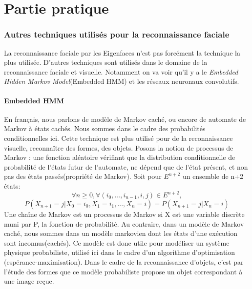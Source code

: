 \documentclass[12pt,french]{article}
\theoremstyle{plain}
\theoremstyle{definition}
\begin{document}
\newpage
\part{Partie pratique}
\section{Autres techniques utilisés pour la reconnaissance faciale}
La reconnaissance faciale par les Eigenfaces n'est pas forcément la technique la plus utilisée. D'autres techniques sont utilisés dans le domaine de la reconnaissance faciale et visuelle. Notamment on va voir qu'il y a le \textit{ Embedded Hidden Markov Model}(Embedded HMM) et les réseaux neuronaux convolutifs.
\subsection{Embedded HMM}
En français, nous parlons de modèle de Markov caché, ou encore de automate de Markov à états cachés. Nous sommes dans le cadre des probabilités conditionnelles ici. Cette technique est plus utilisé pour de la reconnaissance visuelle, reconnaître des formes, des objets.
Posons la notion de processus de Markov : une fonction aléatoire vérifiant que la distribution conditionnelle de probabilité de l'états futur de l'automate, ne dépend que de l'état présent, et non pas des états passés(propriété de Markov). Soit pour $E^{n+2}$ un ensemble de n+2 états:
\[
  \forall n\geq0, \forall(i_0,..., i_{n-1}, i, j)\in E^{n+2},
\]
\[
  P(X_{n+1}=j | X_0=i_0, X_1=i_1, ..., X_n=i) = P(X_{n+1}=j | X_n=i)
\]
Une chaîne de Markov est un processus de Markov si X est une variable discrète muni par P, la fonction de probabilité.
Au contraire, dans un modèle de Markov caché, nous sommes dans un modèle markovien dont les états d'une exécution sont inconnus(cachés).
Ce modèle est donc utile pour modéliser un système physique probabiliste, utilisé ici dans le cadre d'un algorithme d'optimisation (espérance-maximisation).
Dans le cadre de la reconnaissance d'objets, c'est par l'étude des formes que ce modèle probabiliste propose un objet correspondant à une image reçue.
\end{document}
